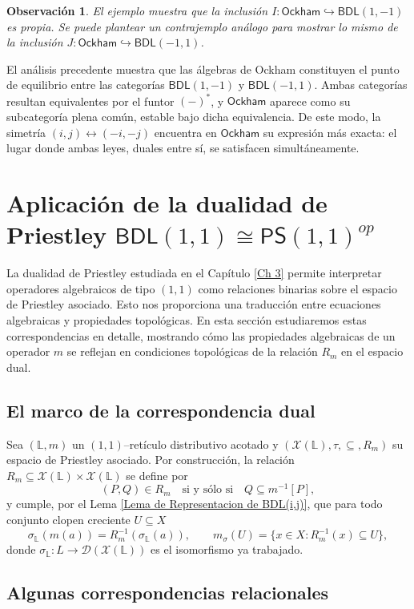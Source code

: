 \documentclass[12pt]{book}
\newtheorem{remark}[theorem]{Observación}
\newcommand{\BDL}{\mathsf{BDL}}
\newcommand{\PS}{\mathsf{PS}}
\newcommand{\Ock}{\mathsf{Ockham}}
\begin{document}
\begin{remark}
El ejemplo muestra que la inclusión $I\colon \Ock\hookrightarrow \BDL(1,-1)$ es propia. Se puede plantear un contrajemplo análogo para mostrar lo mismo de la inclusión $J\colon \Ock\hookrightarrow \BDL(-1,1)$.
\end{remark}
El análisis precedente muestra que las álgebras de Ockham constituyen el punto de equilibrio entre las categorías $\BDL(1,-1)$ y $\BDL(-1,1)$. Ambas categorías resultan equivalentes por el funtor $(-)^*$, y $\Ock$ aparece como su subcategoría plena común, estable bajo dicha equivalencia. De este modo, la simetría $(i,j)\leftrightarrow(-i,-j)$ encuentra en $\Ock$ su expresión más exacta: el lugar donde ambas leyes, duales entre sí, se satisfacen simultáneamente.

\section{Aplicación de la dualidad de Priestley
$\BDL(1,1)\cong\PS(1,1)^{op}$}

La dualidad de Priestley estudiada en el Capítulo \ref{Ch 3} permite interpretar operadores algebraicos de tipo $(1,1)$ como relaciones binarias sobre el espacio de Priestley asociado. Esto nos proporciona una traducción entre ecuaciones algebraicas y propiedades topológicas. En esta sección estudiaremos estas correspondencias en detalle, mostrando cómo las propiedades algebraicas de un operador $m$ se reflejan en condiciones topológicas de la relación $R_m$ en el espacio dual.

\subsection{El marco de la correspondencia dual}

Sea $(\mathbb{L},m)$ un $(1,1)$–retículo distributivo acotado y $(\mathcal{X}(\mathbb{L}),\tau,\subseteq,R_m)$ su espacio de Priestley asociado.  Por construcción, la relación
$R_m\subseteq \mathcal{X}(\mathbb{L})\times \mathcal{X}(\mathbb{L})$ se define por
\[
(P,Q)\in R_m
\quad\text{si y sólo si}\quad
Q\subseteq m^{-1}[P],
\]
y cumple, por el Lema \ref{Lema de Representacion de BDL(i,j)}, que para todo conjunto clopen creciente $U\subseteq X$
\[
\sigma_{\mathbb{L}}(m(a))=R_m^{-1}(\sigma_{\mathbb{L}}(a)), \qquad
m_\sigma(U)=\{x\in X: R_m^{-1}(x)\subseteq U\},
\]
donde $\sigma_{\mathbb{L}}:L\to \mathcal{D}(\mathcal{X}(\mathbb{L}))$ es el isomorfismo ya trabajado.

\subsection{Algunas correspondencias relacionales}
\end{document}
